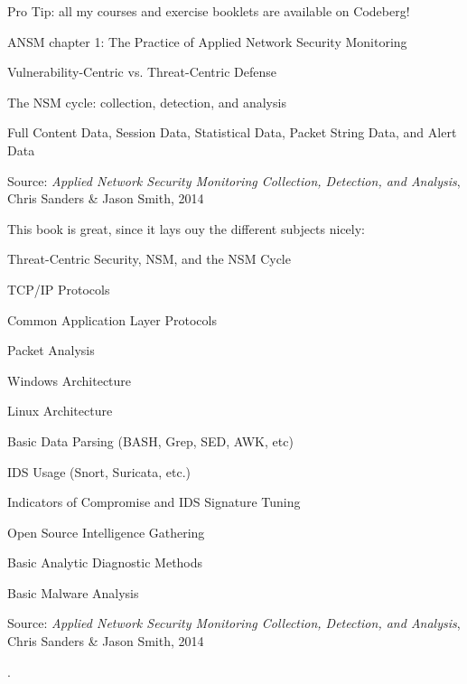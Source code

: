 \documentclass[Screen16to9,17pt]{foils}
\begin{document}
Pro Tip: all my courses and exercise booklets are available on Codeberg!



\begin{list1}
\item ANSM chapter 1: The Practice of Applied
Network Security Monitoring
\begin{list2}
\item Vulnerability-Centric vs. Threat-Centric Defense
\item The NSM cycle: collection, detection, and analysis
\item Full Content Data, Session Data, Statistical Data, Packet String Data, and Alert Data
\end{list2}
\end{list1}
Source: \emph{Applied Network Security Monitoring Collection, Detection, and Analysis}, Chris Sanders \& Jason Smith, 2014



This book is great, since it lays ouy the different subjects nicely:
\begin{list2}\small
\item Threat-Centric Security, NSM, and the NSM Cycle
\item TCP/IP Protocols
\item Common Application Layer Protocols
\item Packet Analysis
\item Windows Architecture
\item Linux Architecture
\item Basic Data Parsing (BASH, Grep, SED, AWK, etc)
\item IDS Usage (Snort, Suricata, etc.)
\item Indicators of Compromise and IDS Signature Tuning
\item Open Source Intelligence Gathering
\item Basic Analytic Diagnostic Methods
\item Basic Malware Analysis
\end{list2}

Source: \emph{Applied Network Security Monitoring Collection, Detection, and Analysis}, Chris Sanders \& Jason Smith, 2014


.
\end{document}
